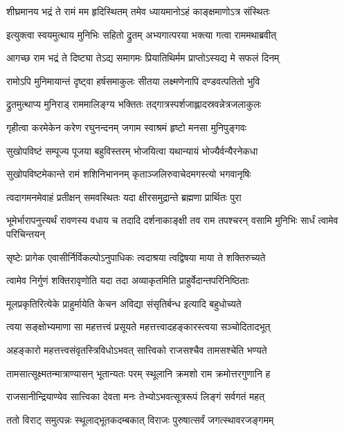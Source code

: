 \twolineshloka
{शीघ्रमानय भद्रं ते रामं मम हृदिस्थितम्}
{तमेव ध्यायमानोऽहं काङ्क्षमाणोऽत्र संस्थितः} %

\twolineshloka
{इत्युक्त्वा स्वयमुत्थाय मुनिभिः सहितो द्रुतम्}
{अभ्यगात्परया भक्त्या गत्वा राममथाब्रवीत्} %

\twolineshloka
{आगच्छ राम भद्रं ते दिष्ट्या तेऽद्य समागमः}
{प्रियातिथिर्मम प्राप्तोऽस्यद्य मे सफलं दिनम्} %

\twolineshloka
{रामोऽपि मुनिमायान्तं दृष्ट्वा हर्षसमाकुलः}
{सीतया लक्ष्मणेनापि दण्डवत्पतितो भुवि} %

\twolineshloka
{द्रुतमुत्थाप्य मुनिराड् राममालिङ्ग्य भक्तितः}
{तद्गात्रस्पर्शजाह्लादस्रवन्नेत्रजलाकुलः} %

\twolineshloka
{गृहीत्वा करमेकेन करेण रघुनन्दनम्}
{जगाम स्वाश्रमं हृष्टो मनसा मुनिपुङ्गवः} %

\twolineshloka
{सुखोपविष्टं सम्पूज्य पूजया बहुविस्तरम्}
{भोजयित्वा यथान्यायं भोज्यैर्वन्यैरनेकधा} %

\twolineshloka
{सुखोपविष्टमेकान्ते रामं शशिनिभाननम्}
{कृताञ्जलिरुवाचेदमगस्त्यो भगवानृषिः} %

\twolineshloka
{त्वदागमनमेवाहं प्रतीक्षन् समवस्थितः}
{यदा क्षीरसमुद्रान्ते ब्रह्मणा प्रार्थितः पुरा} %

\threelineshloka
{भूमेर्भारापनुत्त्यर्थं रावणस्य वधाय च}
{तदादि दर्शनाकाङ्क्षी तव राम तपश्चरन्}
{वसामि मुनिभिः सार्धं त्वामेव परिचिन्तयन्} %

\twolineshloka
{सृष्टेः प्रागेक एवासीर्निर्विकल्पोऽनुपाधिकः}
{त्वदाश्रया त्वद्विषया माया ते शक्तिरुच्यते} %

\twolineshloka
{त्वामेव निर्गुणं शक्तिरावृणोति यदा तदा}
{अव्याकृतमिति प्राहुर्वेदान्तपरिनिष्ठिताः} %

\twolineshloka
{मूलप्रकृतिरित्येके प्राहुर्मायेति केचन}
{अविद्या संसृतिर्बन्ध इत्यादि बहुधोच्यते} %

\twolineshloka
{त्वया सङ्क्षोभ्यमाणा सा महत्तत्त्वं प्रसूयते}
{महत्तत्त्वादहङ्कारस्त्वया सञ्चोदितादभूत्} %

\twolineshloka
{अहङ्कारो महत्तत्त्वसंवृतस्त्रिविधोऽभवत्}
{सात्त्विको राजसश्चैव तामसश्चेति भण्यते} %

\twolineshloka
{तामसात्सूक्ष्मतन्मात्राण्यासन् भूतान्यतः परम्}
{स्थूलानि क्रमशो राम क्रमोत्तरगुणानि ह} %

\twolineshloka
{राजसानीन्द्रियाण्येव सात्त्विका देवता मनः}
{तेभ्योऽभवत्सूत्ररूपं लिङ्गं सर्वगतं महत्} %

\twolineshloka
{ततो विराट् समुत्पन्नः स्थूलाद्भूतकदम्बकात्}
{विराजः पुरुषात्सर्वं जगत्स्थावरजङ्गमम्} %

